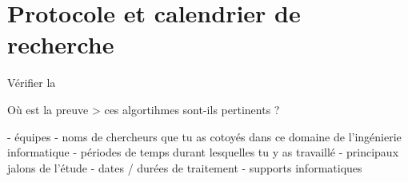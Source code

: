 \chapter{Protocole et calendrier de recherche}


    


    




Vérifier la 

Où est la preuve > ces algortihmes sont-ils pertinents ?


- équipes 
- noms de chercheurs que tu as cotoyés dans ce domaine de l'ingénierie informatique 
- périodes de temps durant lesquelles tu y as travaillé 
- principaux jalons de l'étude 
- dates / durées de  traitement
- supports informatiques 